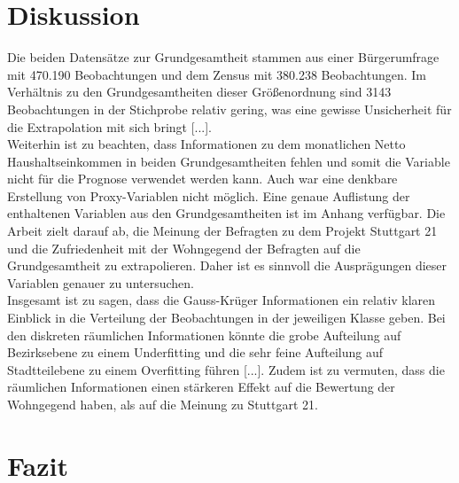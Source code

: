 \documentclass{Vorlage}
\begin{document}
\section{Diskussion}
Die beiden Datensätze zur Grundgesamtheit stammen aus einer Bürgerumfrage mit 470.190 Beobachtungen und dem Zensus mit 380.238 Beobachtungen. Im Verhältnis zu den Grundgesamtheiten dieser Größenordnung sind 3143 Beobachtungen in der Stichprobe relativ gering, was eine gewisse Unsicherheit für die Extrapolation mit sich bringt [...].\\
Weiterhin ist zu beachten, dass Informationen zu dem monatlichen Netto Haushaltseinkommen in beiden Grundgesamtheiten fehlen und somit die Variable nicht für die Prognose verwendet werden kann. Auch war eine denkbare Erstellung von Proxy-Variablen nicht möglich. Eine genaue Auflistung der enthaltenen Variablen aus den Grundgesamtheiten ist im Anhang verfügbar. Die Arbeit zielt darauf ab, die Meinung der Befragten zu dem Projekt Stuttgart 21 und die Zufriedenheit mit der Wohngegend der Befragten auf die Grundgesamtheit zu extrapolieren. Daher ist es sinnvoll die Ausprägungen dieser Variablen genauer zu untersuchen.\\


Insgesamt ist zu sagen, dass die Gauss-Krüger Informationen ein relativ klaren Einblick in die Verteilung der Beobachtungen in der jeweiligen Klasse geben. Bei den diskreten räumlichen Informationen könnte die grobe Aufteilung auf Bezirksebene zu einem Underfitting und die sehr feine Aufteilung auf Stadtteilebene zu einem Overfitting führen [...]. Zudem ist zu vermuten, dass die räumlichen Informationen einen stärkeren Effekt auf die Bewertung der Wohngegend haben, als auf die Meinung zu Stuttgart 21.

\section{Fazit}

\clearpage



 

\end{document}
